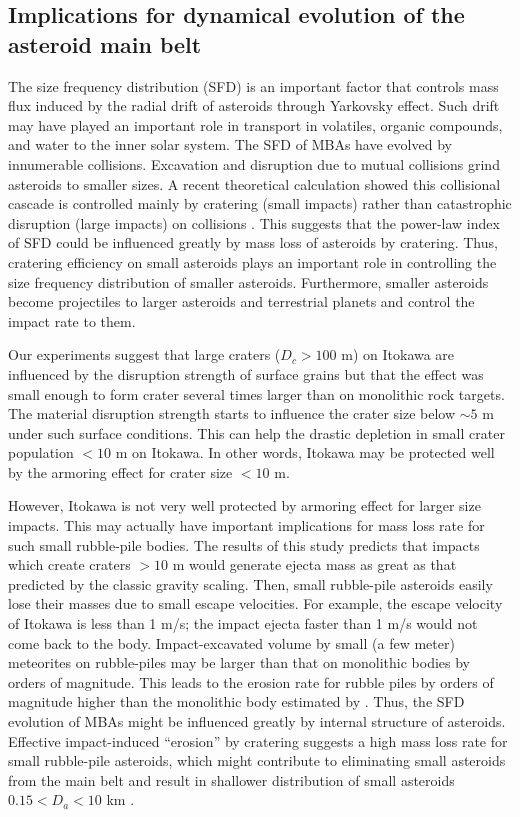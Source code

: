 \documentclass[3p,authoryear]{elsarticle}
\begin{document}
 \subsection{Implications for dynamical evolution of the asteroid main belt}
The size frequency distribution (SFD) is an important factor that controls mass flux induced by the radial drift of asteroids through Yarkovsky effect.
Such drift may have played an important role in transport in volatiles, organic compounds, and water to the inner solar system.
The SFD of MBAs have evolved by innumerable collisions. Excavation and disruption due to mutual collisions grind asteroids to smaller sizes. A recent theoretical calculation showed this collisional cascade is controlled mainly by cratering (small impacts) rather than catastrophic disruption (large impacts) on collisions \citep{kobayashi2010}.
This suggests that the power-law index of SFD could be influenced greatly by mass loss of asteroids by cratering.
Thus, cratering efficiency on small asteroids plays an important role in controlling the size frequency distribution of smaller asteroids.
Furthermore, smaller asteroids become projectiles to larger asteroids and terrestrial planets and control the impact rate to them.

Our experiments suggest that large craters ($D_c>100$ m) on Itokawa are influenced by the disruption strength of surface grains but that the effect was small enough to form crater several times larger than on monolithic rock targets.
The material disruption strength starts to influence the crater size below $\sim 5$ m under such surface conditions. This can help the drastic depletion in small crater population $< 10$ m on Itokawa.
In other words, Itokawa may be protected well by the armoring effect for crater size $<10$ m.

However, Itokawa is not very well protected by armoring effect for larger size impacts.
This may actually have important implications for mass loss rate for such small rubble-pile bodies.
The results of this study predicts that impacts which create craters $>10$ m would generate ejecta mass as great as that predicted by the classic gravity scaling.
Then, small rubble-pile asteroids easily lose their masses due to small escape velocities.
For example, the escape velocity of Itokawa is less than 1 m/s; the impact ejecta faster than 1 m/s would not come back to the body.
Impact-excavated volume by small (a few meter) meteorites on rubble-piles may be larger than that on monolithic bodies by orders of magnitude.
This leads to the erosion rate for rubble piles by orders of magnitude higher than the monolithic body estimated by \citet{kobayashi2010}.
Thus, the SFD evolution of MBAs might be influenced greatly by internal structure of asteroids.
Effective impact-induced ``erosion'' by cratering suggests a high mass loss rate for small rubble-pile asteroids, which might contribute to eliminating small asteroids from the main belt and result in shallower distribution of small asteroids $0.15 <D_a<10$ km \citep{yoshida2007,gladman2009}.
\end{document}
